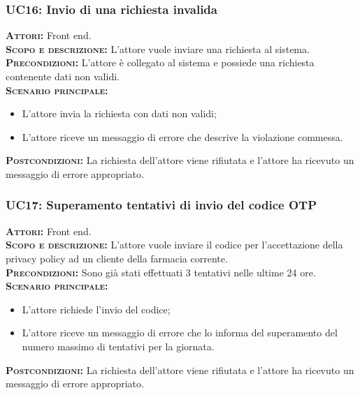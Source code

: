 \subsubsection{UC16: Invio di una richiesta invalida}
\label{sec:UC16}
\textsc{\textbf{Attori:}} Front end.\\
\textsc{\textbf{Scopo e descrizione:}} L'attore vuole inviare una richiesta al sistema.\\
\textsc{\textsc{\textbf{Precondizioni:}}} L'attore è collegato al sistema e possiede una richiesta contenente dati non validi.\\
\textsc{\textbf{Scenario principale:}}
\begin{itemize}
    \item L'attore invia la richiesta con dati non validi;
    \item L'attore riceve un messaggio di errore che descrive la violazione commessa.
\end{itemize}
\textsc{\textbf{Postcondizioni:}} La richiesta dell'attore viene rifiutata e l'attore ha ricevuto un messaggio di errore appropriato.

\subsubsection{UC17: Superamento tentativi di invio del codice OTP}
\label{sec:UC17}
\textsc{\textbf{Attori:}} Front end.\\
\textsc{\textbf{Scopo e descrizione:}} L'attore vuole inviare il codice per l'accettazione della privacy policy ad un cliente della farmacia corrente.\\
\textsc{\textsc{\textbf{Precondizioni:}}} Sono già stati effettuati 3 tentativi nelle ultime 24 ore.\\
\textsc{\textbf{Scenario principale:}}
\begin{itemize}
    \item L'attore richiede l'invio del codice;
    \item L'attore riceve un messaggio di errore che lo informa del superamento del numero massimo di tentativi per la giornata.
\end{itemize}
\textsc{\textbf{Postcondizioni:}} La richiesta dell'attore viene rifiutata e l'attore ha ricevuto un messaggio di errore appropriato.


